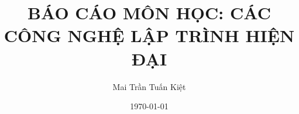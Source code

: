 \documentclass[a4paper,12pt,twoside,openany]{book}
\title{BÁO CÁO MÔN HỌC: CÁC CÔNG NGHỆ LẬP TRÌNH HIỆN ĐẠI}
\author{Mai Trần Tuấn Kiệt}
\date{\today}
\begin{document}
\frontmatter
\makecustomtitle
\tableofcontents



\mainmatter








\backmatter


\end{document}
